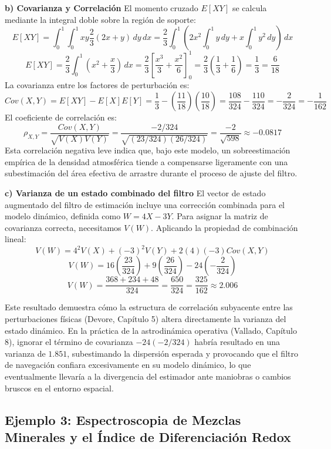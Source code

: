 \textbf{b) Covarianza y Correlación}
El momento cruzado $E[XY]$ se calcula mediante la integral doble sobre la región de soporte:
$$ E[XY] = \int_{0}^{1} \int_{0}^{1} xy \frac{2}{3}(2x + y) \, dy \, dx = \frac{2}{3} \int_{0}^{1} \left( 2x^2 \int_{0}^{1} y \, dy + x \int_{0}^{1} y^2 \, dy \right) \, dx $$
$$ E[XY] = \frac{2}{3} \int_{0}^{1} \left( x^2 + \frac{x}{3} \right) \, dx = \frac{2}{3} \left[ \frac{x^3}{3} + \frac{x^2}{6} \right]_{0}^{1} = \frac{2}{3} \left( \frac{1}{3} + \frac{1}{6} \right) = \frac{1}{3} = \frac{6}{18} $$
La covarianza entre los factores de perturbación es:
$$ Cov(X,Y) = E[XY] - E[X]E[Y] = \frac{1}{3} - \left(\frac{11}{18}\right)\left(\frac{10}{18}\right) = \frac{108}{324} - \frac{110}{324} = -\frac{2}{324} = -\frac{1}{162} $$
El coeficiente de correlación es:
$$ \rho_{X,Y} = \frac{Cov(X,Y)}{\sqrt{V(X)V(Y)}} = \frac{-2/324}{\sqrt{(23/324)(26/324)}} = \frac{-2}{\sqrt{598}} \approx -0.0817 $$
Esta correlación negativa leve indica que, bajo este modelo, un sobreestimación empírica de la densidad atmosférica tiende a compensarse ligeramente con una subestimación del área efectiva de arrastre durante el proceso de ajuste del filtro.

\textbf{c) Varianza de un estado combinado del filtro}
El vector de estado augmentado del filtro de estimación incluye una corrección combinada para el modelo dinámico, definida como $W = 4X - 3Y$. Para asignar la matriz de covarianza correcta, necesitamos $V(W)$. Aplicando la propiedad de combinación lineal:
$$ V(W) = 4^2 V(X) + (-3)^2 V(Y) + 2(4)(-3) Cov(X,Y) $$
$$ V(W) = 16 \left(\frac{23}{324}\right) + 9 \left(\frac{26}{324}\right) - 24 \left(-\frac{2}{324}\right) $$
$$ V(W) = \frac{368 + 234 + 48}{324} = \frac{650}{324} = \frac{325}{162} \approx 2.006 $$

Este resultado demuestra cómo la estructura de correlación subyacente entre las perturbaciones físicas (Devore, Capítulo 5) altera directamente la varianza del estado dinámico. En la práctica de la astrodinámica operativa (Vallado, Capítulo 8), ignorar el término de covarianza $-24(-2/324)$ habría resultado en una varianza de $1.851$, subestimando la dispersión esperada y provocando que el filtro de navegación confiara excesivamente en su modelo dinámico, lo que eventualmente llevaría a la divergencia del estimador ante maniobras o cambios bruscos en el entorno espacial.



\subsection{Ejemplo 3: Espectroscopia de Mezclas Minerales y el Índice de Diferenciación Redox}

